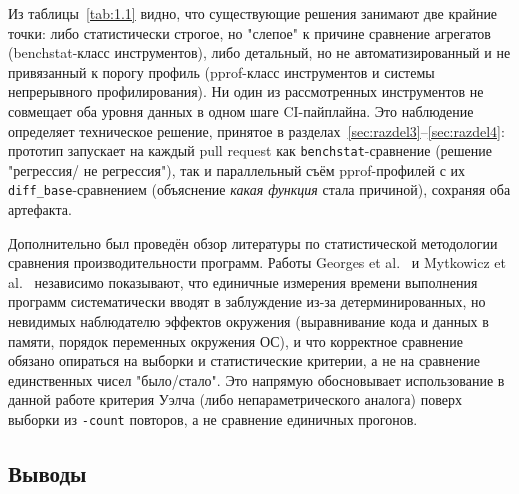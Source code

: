 Из таблицы~\ref{tab:1.1} видно, что существующие решения занимают две
крайние точки: либо статистически строгое, но "слепое" к причине сравнение
агрегатов (benchstat-класс инструментов), либо детальный, но не
автоматизированный и не привязанный к порогу профиль (pprof-класс
инструментов и системы непрерывного профилирования). Ни один из
рассмотренных инструментов не совмещает оба уровня данных в одном шаге
CI-пайплайна. Это наблюдение определяет техническое решение,
принятое в разделах~\ref{sec:razdel3}--\ref{sec:razdel4}: прототип запускает
на каждый pull request как \texttt{benchstat}-сравнение (решение "регрессия/
не регрессия"), так и параллельный съём pprof-профилей с их
\texttt{diff\_base}-сравнением (объяснение \emph{какая функция} стала
причиной), сохраняя оба артефакта.

Дополнительно был проведён обзор литературы по статистической методологии
сравнения производительности программ. Работы Georges et al.~\cite{georges2007}
и Mytkowicz et al.~\cite{mytkowicz2009} независимо показывают, что
единичные измерения времени выполнения программ систематически вводят в
заблуждение из-за детерминированных, но невидимых наблюдателю эффектов
окружения (выравнивание кода и данных в памяти, порядок переменных
окружения ОС), и что корректное сравнение обязано опираться на выборки
и статистические критерии, а не на сравнение единственных чисел "было/стало".
Это напрямую обосновывает использование в данной работе критерия Уэлча
(либо непараметрического аналога) поверх выборки из \texttt{-count} повторов,
а не сравнение единичных прогонов.

\subsection{Выводы}


